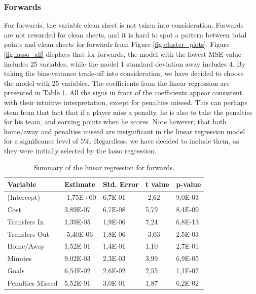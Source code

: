 \subsubsection{Forwards}
For forwards, the variable clean sheet is not taken into consideration. Forwards are not rewarded for clean sheets, and it is hard to spot a pattern between total points and clean sheets for forwards from Figure \ref{fig:cluster_plots}. Figure \ref{fig:lasso_all} displays that for forwards, the model with the lowest MSE value includes 25 variables, while the model 1 standard deviation away includes 4. By taking the bias-variance trade-off into consideration, we have decided to choose the model with 25 variables. The coefficients from the linear regression are presented in Table \ref{tab:coef_FWD}. All the signs in front of the coefficients appear consistent with their intuitive interpretation, except for penalties missed. This can perhaps stem from that fact that if a player miss a penalty, he is also to take the penalties for his team, and earning points when he scores. Note however, that both home/away and penalties missed are insignificant in the linear regression model for a significance level of 5\%. Regardless, we have decided to include them, as they were initially selected by the lasso regression.

\begin{table}[H]
\centering
\begin{tabular}{|l|l|l|l|l|}
\hline
Variable         & Estimate  & Std. Error & t value & p-value \\ \hline
(Intercept)      & -1,75E+00 & 6,7E-01    & -2,62   & 9,0E-03 \\
Cost             & 3,89E-07  & 6,7E-08    & 5,79    & 8,4E-09 \\
Transfers In     & 1,39E-05  & 1,9E-06    & 7,24    & 6,8E-13 \\
Transfers Out    & -5,40E-06 & 1,8E-06    & -3,03   & 2,5E-03 \\
Home/Away        & 1,52E-01  & 1,4E-01    & 1,10    & 2,7E-01 \\
Minutes          & 9,02E-03  & 2,3E-03    & 3,99    & 6,9E-05 \\
Goals            & 6,54E-02  & 2,6E-02    & 2,55    & 1,1E-02 \\
Penalties Missed & 5,52E-01  & 3,0E-01    & 1,87    & 6,2E-02 \\
\hline
\end{tabular}
\caption{Summary of the linear regression for forwards.}
\label{tab:coef_FWD}
\end{table}

